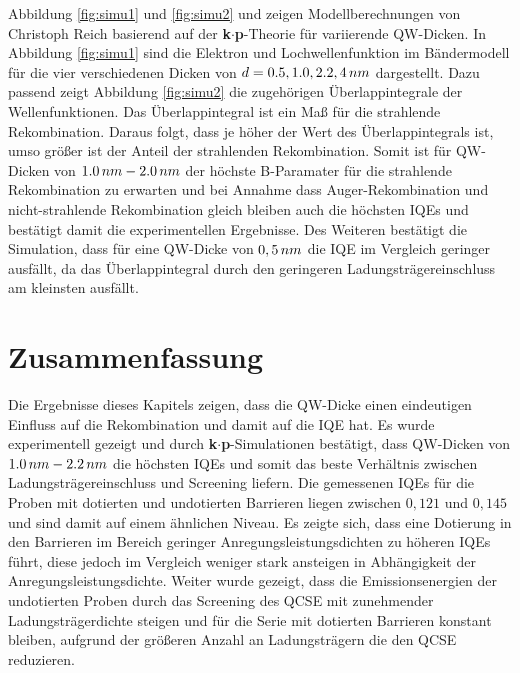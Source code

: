 \noindent 
Abbildung \ref{fig:simu1} und \ref{fig:simu2} und zeigen Modellberechnungen von Christoph Reich basierend auf der \textbf{k$\cdot$p}-Theorie für variierende QW-Dicken. In Abbildung \ref{fig:simu1} sind die Elektron und Lochwellenfunktion im Bändermodell für die vier verschiedenen Dicken von 
$d=0.5,1.0,2.2,4 \thinspace nm$ dargestellt. 
\newline
Dazu passend zeigt Abbildung \ref{fig:simu2} die zugehörigen Überlappintegrale der Wellenfunktionen.
Das Überlappintegral ist ein Maß für die strahlende Rekombination. Daraus folgt, dass je höher der Wert des Überlappintegrals ist, umso größer ist der Anteil der strahlenden Rekombination. 
Somit ist für QW-Dicken von $1.0 \thinspace nm- 2.0 \thinspace nm$ der höchste B-Paramater für die strahlende Rekombination zu erwarten und
bei Annahme dass Auger-Rekombination und nicht-strahlende Rekombination gleich bleiben auch die höchsten IQEs und bestätigt damit die experimentellen Ergebnisse.
\newline
Des Weiteren bestätigt die Simulation, dass für eine QW-Dicke von $0,5 \thinspace nm$ die IQE im Vergleich geringer ausfällt, da das Überlappintegral durch den geringeren Ladungsträgereinschluss am kleinsten ausfällt. 

\section{Zusammenfassung}

Die Ergebnisse dieses Kapitels zeigen, dass die QW-Dicke einen eindeutigen Einfluss auf die Rekombination und damit auf die IQE hat. Es wurde experimentell gezeigt und durch \textbf{k$\cdot$p}-Simulationen bestätigt, dass QW-Dicken von $1.0 \thinspace nm- 2.2 \thinspace nm$ die höchsten IQEs und somit das beste Verhältnis zwischen Ladungsträgereinschluss und Screening liefern. 
\newline
Die gemessenen IQEs für die Proben mit dotierten und undotierten Barrieren liegen zwischen $0,121$ und $0,145$ und sind damit auf einem ähnlichen Niveau. Es zeigte sich, dass eine Dotierung in den Barrieren im Bereich geringer Anregungsleistungsdichten zu höheren IQEs führt, diese jedoch im Vergleich weniger stark ansteigen in Abhängigkeit der Anregungsleistungsdichte.
\newline
Weiter wurde gezeigt, dass die Emissionsenergien der undotierten Proben durch das Screening des QCSE mit zunehmender Ladungsträgerdichte steigen und für die Serie mit dotierten Barrieren konstant bleiben, aufgrund der größeren Anzahl an Ladungsträgern die den QCSE reduzieren.
